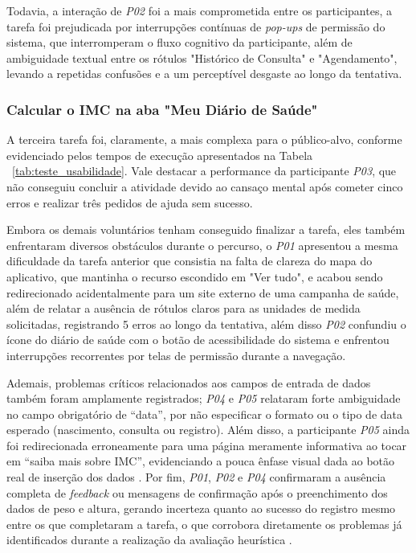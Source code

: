 \documentclass[12pt]{article}
\begin{document}
\begin{abstractp}
Todavia, a interação de \textit{P02} foi a mais comprometida entre os participantes, a tarefa foi prejudicada por interrupções contínuas de \textit{pop-ups} de permissão do sistema, que interromperam o fluxo cognitivo da participante, além de ambiguidade textual entre os rótulos "Histórico de Consulta" e "Agendamento", levando a repetidas confusões e a um perceptível desgaste ao longo da tentativa.

\subsubsection{Calcular o IMC na aba "Meu Diário de Saúde"}
A terceira tarefa foi, claramente, a mais complexa para o público-alvo, conforme evidenciado pelos tempos de execução apresentados na Tabela ~\ref{tab:teste_usabilidade}. Vale destacar a performance da participante \textit{P03}, que não conseguiu concluir a atividade devido ao cansaço mental após cometer cinco erros e realizar três pedidos de ajuda sem sucesso.

Embora os demais voluntários tenham conseguido finalizar a tarefa, eles também enfrentaram diversos obstáculos durante o percurso, o \textit{P01} apresentou a mesma dificuldade da tarefa anterior que consistia na falta de clareza do mapa do aplicativo, que mantinha o recurso escondido em "Ver tudo", e acabou sendo redirecionado acidentalmente para um site externo de uma campanha de saúde, além de relatar a ausência de rótulos claros para as unidades de medida solicitadas, registrando 5 erros ao longo da tentativa, além disso \textit{P02} confundiu o ícone do diário de saúde com o botão de acessibilidade do sistema e enfrentou interrupções recorrentes por telas de permissão durante a navegação.


Ademais, problemas críticos relacionados aos campos de entrada de dados também foram amplamente registrados; \textit{P04} e \textit{P05} relataram forte ambiguidade no campo obrigatório de ``data'', por não especificar o formato ou o tipo de data esperado (nascimento, consulta ou registro). Além disso, a participante \textit{P05} ainda foi redirecionada erroneamente para uma página meramente informativa ao tocar em ``saiba mais sobre IMC'', evidenciando a pouca ênfase visual dada ao botão real de inserção dos dados . Por fim, \textit{P01}, \textit{P02} e \textit{P04} confirmaram a ausência completa de \textit{feedback} ou mensagens de confirmação após o preenchimento dos dados de peso e altura, gerando incerteza quanto ao sucesso do registro mesmo entre os que completaram a tarefa, o que corrobora diretamente os problemas já identificados durante a realização da avaliação heurística .


\end{abstractp}
\end{document}
